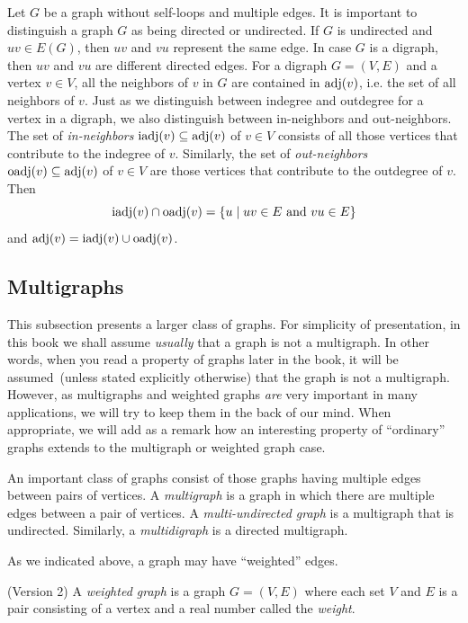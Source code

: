 Let $G$ be a graph without self-loops and multiple edges. It is
important to distinguish a graph $G$ as being directed or undirected.
If $G$ is undirected and $uv \in E(G)$, then $uv$ and $vu$
represent the same edge. In case $G$ is a digraph, then $uv$ and $vu$
are different directed edges. For a digraph $G = (V, E)$ and a vertex
$v \in V$, all the neighbors of $v$ in $G$ are contained in $\operatorname*{adj}(v)$,
i.e. the set of all neighbors of $v$. Just as we distinguish between
indegree and outdegree for a vertex in a digraph, we also distinguish
between in-neighbors and out-neighbors. The set of
\emph{in-neighbors}
$\operatorname*{iadj}(v) \subseteq \operatorname*{adj}(v)$\index{$\iadj$} of $v \in V$ consists of
all those vertices that contribute to the indegree of $v$. Similarly,
the set of \emph{out-neighbors}
$\operatorname*{oadj}(v) \subseteq \operatorname*{adj}(v)$\index{$\oadj$} of $v \in V$ are those
vertices that contribute to the outdegree of $v$. Then
\[
\operatorname*{iadj}(v) \cap \operatorname*{oadj}(v)
=
\{u \mid uv \in E \text{ and } vu \in E\}
\]
and $\operatorname*{adj}(v) = \operatorname*{iadj}(v) \cup \operatorname*{oadj}(v)$.

\subsection{Multigraphs}

This subsection presents a larger class of graphs. For simplicity of
presentation, in this book we shall assume \emph{usually} that a graph
is not a multigraph. In other words, when you read a property of
graphs later in the book, it will be assumed~(unless stated explicitly
otherwise) that the graph is not a multigraph. However, as multigraphs
and weighted graphs \emph{are} very important in many applications, we
will try to keep them in the back of our mind. When appropriate, we
will add as a remark how an interesting property of ``ordinary''
graphs extends to the multigraph or weighted graph case.

An important class of graphs consist of those graphs having multiple
edges between pairs of vertices. A
\emph{multigraph} is a graph
in which there are multiple edges between a pair of vertices. A
\emph{multi-undirected graph} is a
multigraph that is undirected. Similarly, a
\emph{multidigraph} is a directed multigraph.

As we indicated above, a graph may have ``weighted''
edges.

\begin{definition} (Version 2)
{\rm
A \emph{weighted graph} is a graph $G = (V, E)$
where each set $V$ and $E$ is a pair consisting of a vertex and a real
number called the \emph{weight}.
}
\end{definition}

